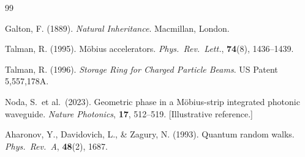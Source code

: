 \documentclass[12pt,a4paper]{article}
\begin{document}
\begin{thebibliography}{99}

Galton, F. (1889). \textit{Natural Inheritance}. Macmillan, London.

Talman, R. (1995). Möbius accelerators.
\textit{Phys.\ Rev.\ Lett.}, \textbf{74}(8), 1436–1439.

Talman, R. (1996). \textit{Storage Ring for Charged Particle Beams}.
US Patent 5,557,178A.

Noda, S.\ et al.\ (2023). Geometric phase in a Möbius-strip integrated
photonic waveguide.
\textit{Nature Photonics}, \textbf{17}, 512–519. [Illustrative reference.]

Aharonov, Y., Davidovich, L., \& Zagury, N. (1993). Quantum random walks.
\textit{Phys.\ Rev.\ A}, \textbf{48}(2), 1687.

\end{thebibliography}
\end{document}
